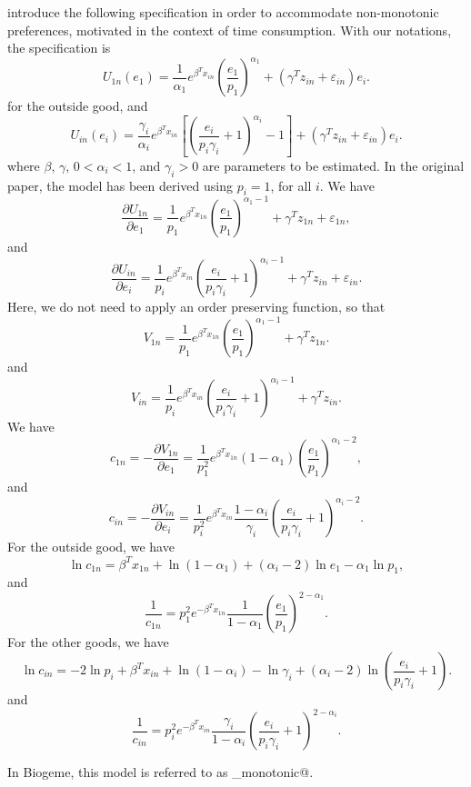 \documentclass[12pt,a4paper]{article}
\begin{document}
 introduce the following specification in order to accommodate non-monotonic preferences, motivated in the context of time consumption. With our notations, the specification is
\[
U_{1n}(e_1) =  \frac{1}{\alpha_1}e^{\beta^T x_{in}}\left(\frac{e_1}{p_1}\right)^{\alpha_1}+(\gamma^T z_{in} + \varepsilon_{in}) e_i.
\]
for the outside good, and
\[
U_{in}(e_i) = \frac{\gamma_i}{\alpha_i} e^{\beta^T x_{in}}\left[\left(\frac{e_i}{p_i \gamma_i}+1\right)^{\alpha_i}-1\right]+(\gamma^T z_{in} + \varepsilon_{in}) e_i.
\]
where $\beta$, $\gamma$, $0 < \alpha_i < 1$, and $\gamma_i > 0$  are parameters to be
estimated. In the original paper, the model has been derived using $p_i=1$, for all $i$.
We have
\[
\frac{\partial U_{1n}}{\partial e_1} = \frac{1}{p_1} e^{\beta^T x_{1n}}  \left(\frac{e_1}{p_1}\right)^{\alpha_1-1} + \gamma^T z_{1n} + \varepsilon_{1n},
\]
and
\[
\frac{\partial U_{in}}{\partial e_i} = \frac{1}{p_i} e^{\beta^T x_{in}}  \left(\frac{e_i}{p_i \gamma_i}+1\right)^{\alpha_i-1} + \gamma^T z_{in} + \varepsilon_{in}.
\]
Here, we do not need to apply an order preserving function, so that
\[
V_{1n} = \frac{1}{p_1} e^{\beta^T x_{1n}}  \left(\frac{e_1}{p_1}\right)^{\alpha_1-1} + \gamma^T z_{1n}.
\]
and
\[
V_{in} = \frac{1}{p_i} e^{\beta^T x_{in}}  \left(\frac{e_i}{p_i \gamma_i}+1\right)^{\alpha_i-1} + \gamma^T z_{in}.
\]
We have
\[
c_{1n} = -\frac{\partial V_{1n}}{\partial e_1} =  \frac{1}{p^2_1} e^{\beta^T x_{1n}} (1-\alpha_1)\left(\frac{e_1}{p_1}\right)^{\alpha_1-2},
\]
and
\[
c_{in} = -\frac{\partial V_{in}}{\partial e_i} =  \frac{1}{p^2_i} e^{\beta^T x_{in}} \frac{1-\alpha_i}{\gamma_i}\left(\frac{e_i}{p_i \gamma_i}+1\right)^{\alpha_i-2}.
\]
For the outside good, we have
\[
\ln c_{1n} =  \beta^T x_{1n} + \ln (1-\alpha_1) +(\alpha_i-2) \ln e_1 - \alpha_1 \ln p_1,
\]
and
\[
\frac{1}{c_{1n}} =  p^2_1 e^{-\beta^T x_{1n}} \frac{1}{1-\alpha_1}\left(\frac{e_1}{p_1}\right)^{2-\alpha_1}.
\]
For the other goods, we have
\[
\ln c_{in} = -2\ln p_i + \beta^T x_{in} + \ln (1-\alpha_i) -\ln \gamma_i +(\alpha_i-2) \ln\left(\frac{e_i}{p_i \gamma_i}+1\right).
\]
and
\[
\frac{1}{c_{in}} =  p^2_i e^{-\beta^T x_{in}} \frac{\gamma_i}{1-\alpha_i}\left(\frac{e_i}{p_i \gamma_i}+1\right)^{2-\alpha_i}.
\]

In Biogeme, this model is referred to as \lstinline@non_monotonic@.


%
%
\end{document}
